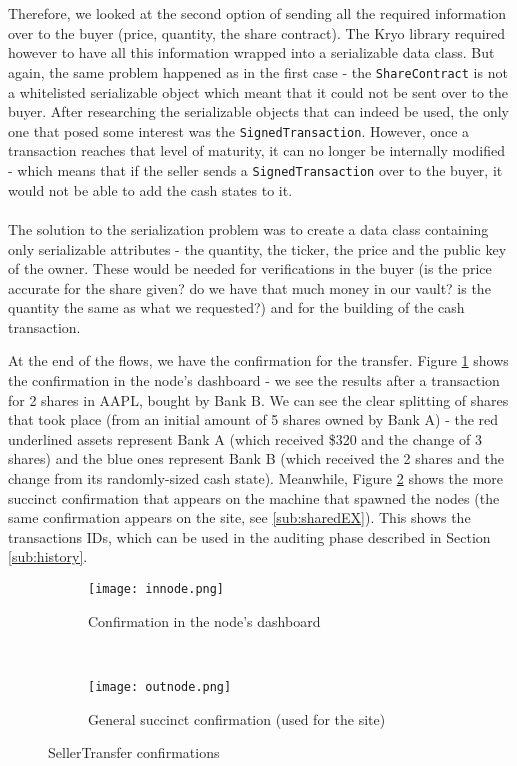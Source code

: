 \documentclass[12pt,twoside]{article}
\begin{document}
\\ \\
Therefore, we looked at the second option of sending all the required information over to the buyer (price, quantity, the share contract). The Kryo library required however to have all this information wrapped into a serializable data class. But again, the same problem happened as in the first case - the \verb|ShareContract| is not a whitelisted serializable object which meant that it could not be sent over to the buyer. After researching the serializable objects that can indeed be used, the only one that posed some interest was the \verb|SignedTransaction|. However, once a transaction reaches that level of maturity, it can no longer be internally modified - which means that if the seller sends a \verb|SignedTransaction| over to the buyer, it would not be able to add the cash states to it. 
\\ \\
The solution to the serialization problem was to create a data class containing only serializable attributes - the quantity, the ticker, the price and the public key of the owner. These would be needed for verifications in the buyer (is the price accurate for the share given? do we have that much money in our vault? is the quantity the same as what we requested?) and for the building of the cash transaction. 

At the end of the flows, we have the confirmation for the transfer. Figure \ref{fig:innodeconf} shows the confirmation in the node's dashboard - we see the results after a transaction for 2 shares in AAPL, bought by Bank B. We can see the clear splitting of shares that took place (from an initial amount of 5 shares owned by Bank A) - the red underlined assets represent Bank A (which received \$320 and the change of 3 shares) and the blue ones represent Bank B (which received the 2 shares and the change from its randomly-sized cash state). Meanwhile, Figure \ref{fig:outnodeconf} shows the more succinct confirmation that appears on the machine that spawned the nodes (the same confirmation appears on the site, see \ref{sub:sharedEX}). This shows the transactions IDs, which can be used in the auditing phase described in Section \ref{sub:history}.
\begin{figure}[!htb]
    \centering
    \begin{subfigure}[b]{1\textwidth}
    	\centering
        \texttt{[image: innode.png]}
        \caption{Confirmation in the node's dashboard}
        \label{fig:innodeconf}
    \end{subfigure}
    ~
    \begin{subfigure}[b]{0.8\textwidth}
    	\centering
        \texttt{[image: outnode.png]}
        \caption{General succinct confirmation (used for the site)}
        \label{fig:outnodeconf}
    \end{subfigure}
    \caption{SellerTransfer confirmations}
    \label{fig:confs}
\end{figure}
\end{document}
